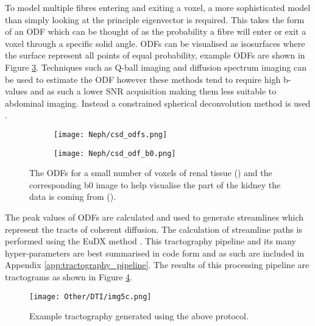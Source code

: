 To model multiple fibres entering and exiting a voxel, a more sophisticated model than simply looking at the principle eigenvector is required. This takes the form of an \ac{ODF} which can be thought of as the probability a fibre will enter or exit a voxel through a specific solid angle. \acp{ODF} can be visualised as isosurfaces where the surface represent all points of equal probability, example \acp{ODF} are shown in Figure \ref{fig:ex_dti_odf}. Techniques such as Q-ball imaging \cite{descoteaux_regularized_2007, hess_q-ball_2006} and diffusion spectrum imaging \cite{descoteaux_regularized_2007} can be used to estimate the \ac{ODF} however these methods tend to require high b-values and as such a lower \ac{SNR} acquisition making them less suitable to abdominal imaging. Instead a constrained spherical deconvolution method is used \cite{tournier_direct_2004, tournier_robust_2007, tax_recursive_2014}.

\begin{figure}[H]
	\centering
	\begin{subfigure}[c]{0.47\textwidth}
		\centering
		\texttt{[image: Neph/csd\_odfs.png]}
		\caption{}
		\label{fig:ex_dti_odfs}
	\end{subfigure}
	\hfill
	\begin{subfigure}[c]{0.47\textwidth}
		\centering
		\texttt{[image: Neph/csd\_odf\_b0.png]}
		\caption{}
		\label{fig:ex_dti_odf_b0}
	\end{subfigure}
	\caption{The \acp{ODF} for a small number of voxels of renal tissue () and the corresponding b0 image to help visualise the part of the kidney the data is coming from ().}
	\label{fig:ex_dti_odf}
\end{figure}

The peak values of \acp{ODF} are calculated and used to generate streamlines which represent the tracts of coherent diffusion. The calculation of streamline paths is performed using the \ac{EuDX} method \cite{garyfallidis_towards_2013}. This tractography pipeline and its many hyper-parameters are best summarised in code form and as such are included in Appendix \ref{app:tractography_pipeline}. The results of this processing pipeline are tractograms as shown in Figure \ref{fig:ex_dti_tracts}.

\begin{figure}[H]
	\centering
	\texttt{[image: Other/DTI/img5c.png]}
	\caption{Example tractography generated using the above protocol.}
	\label{fig:ex_dti_tracts}
\end{figure}

